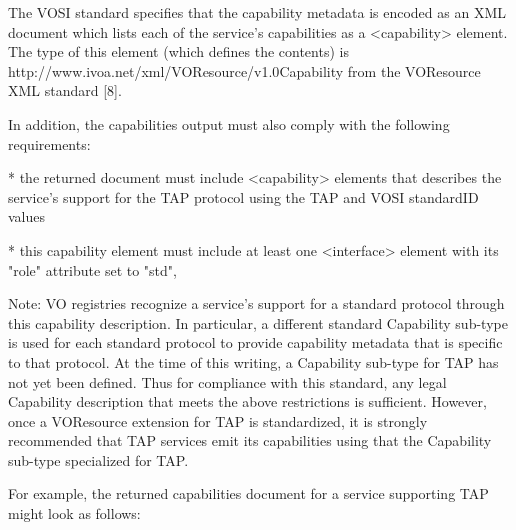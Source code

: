 \documentclass[11pt,a4paper]{ivoa}
\begin{document}
The VOSI standard specifies that the capability metadata is encoded as an XML 
document which lists each of the service's capabilities as a <capability> 
element. The type of this element (which defines the contents) is 
{http://www.ivoa.net/xml/VOResource/v1.0}Capability from the VOResource XML 
standard [8].

In addition, the capabilities output must also comply with the following    
requirements:

* the returned document must include <capability> elements 
that describes the service's support for the TAP protocol using the TAP and 
VOSI standardID values

* this capability element must include at least one <interface> element 
with its "role" attribute set to "std",  

Note: VO registries recognize a service's support for a standard protocol 
through this capability description. In particular, a different standard 
Capability sub-type is used for each standard protocol to provide capability 
metadata that is specific to that protocol. At the time of this writing, a 
Capability sub-type for TAP has not yet been defined. Thus for compliance with 
this standard, any legal Capability description that meets the above 
restrictions is sufficient. However, once a VOResource extension for TAP is 
standardized, it is strongly recommended that TAP services emit its 
capabilities using that the Capability sub-type specialized for TAP.

For example, the returned capabilities document for a service supporting  TAP 
might look as follows:
\end{document}
